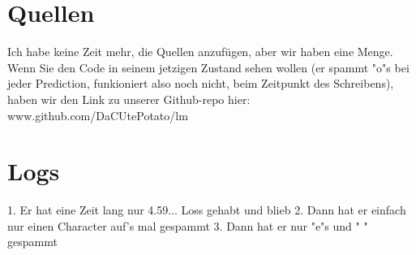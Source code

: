 \documentclass[12pt, letterpaper]{article}
\begin{document}
\section{Quellen}
Ich habe keine Zeit mehr, die Quellen anzufügen, aber wir haben eine Menge. Wenn Sie den Code in seinem jetzigen Zustand sehen wollen (er spammt "o"s bei jeder Prediction, funkioniert also noch nicht, beim Zeitpunkt des Schreibens), haben wir den Link zu unserer Github-repo hier:\\
www.github.com/DaCUtePotato/lm

\section{Logs}
1. Er hat eine Zeit lang nur 4.59... Loss gehabt und blieb
2. Dann hat er einfach nur einen Character auf's mal gespammt
3. Dann hat er nur "e"s und " " gespammt
\end{document}
